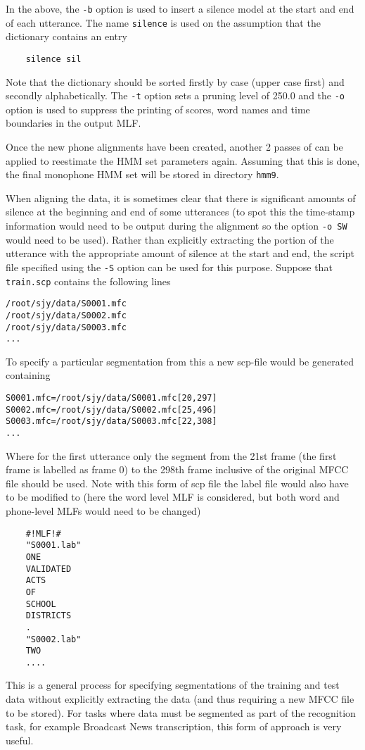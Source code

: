 In the above, the \texttt{-b} option is used to insert a silence model
at the start and end of each utterance.  The name \texttt{silence} is used
on the assumption that the dictionary contains an entry
\begin{verbatim}
    silence sil
\end{verbatim}
Note that the dictionary should be sorted firstly by case (upper case first) and secondly 
alphabetically.  The \texttt{-t} option sets a pruning level of 250.0 and the \texttt{-o} 
option is used to suppress the printing of scores, word names and time
boundaries in the output MLF.


Once the new phone alignments have been created, another  2 passes
of  can be applied to reestimate the HMM set parameters
again.  Assuming that this is done, the final monophone HMM set will
be stored in directory \texttt{hmm9}.

When aligning the data, it is sometimes clear that there is significant
amounts of silence at the beginning and end of some utterances (to spot this the 
time-stamp information would need to be output during the alignment 
so the option {\tt -o SW} would need to be used). Rather than explicitly 
extracting the portion of the utterance with the appropriate amount of silence at the start and end, the script file specified using the {\tt -S} option can 
be used for this purpose. Suppose that \texttt{train.scp} contains the 
following lines
\begin{verbatim}
/root/sjy/data/S0001.mfc
/root/sjy/data/S0002.mfc
/root/sjy/data/S0003.mfc
...
\end{verbatim}
To specify a particular segmentation from this a new scp-file would be
generated containing
\begin{verbatim}
S0001.mfc=/root/sjy/data/S0001.mfc[20,297]
S0002.mfc=/root/sjy/data/S0002.mfc[25,496]
S0003.mfc=/root/sjy/data/S0003.mfc[22,308]
...
\end{verbatim}
Where for the first utterance only the segment from the 21st frame (the first frame is labelled as frame 0) to the 298th frame inclusive of the original MFCC file should be used. Note with this form of scp file the label file would also have to be modified to (here the word level MLF is considered, but both word and phone-level MLFs would need to be changed)
\begin{verbatim}
    #!MLF!#
    "S0001.lab"
    ONE 
    VALIDATED 
    ACTS 
    OF 
    SCHOOL 
    DISTRICTS
    .
    "S0002.lab"
    TWO 
    ....
\end{verbatim}
This is a general process for specifying segmentations of the training
and test data without explicitly extracting the data (and thus requiring a new
MFCC file to be stored). For tasks where data must be segmented as part of the
recognition task, for example Broadcast News transcription, this form of
approach is very useful.

